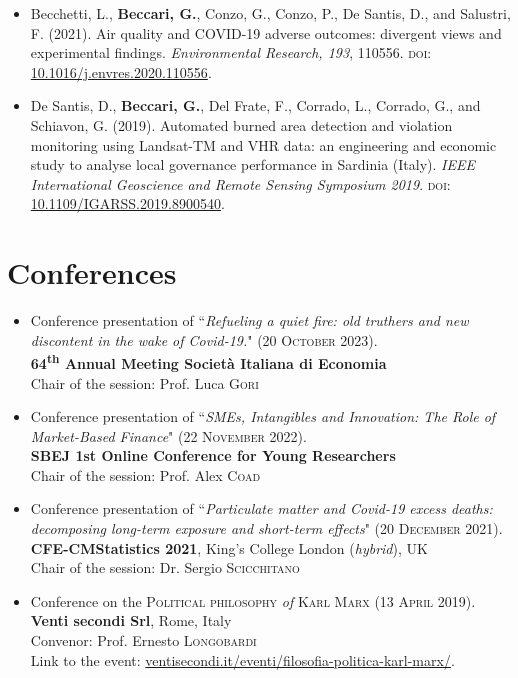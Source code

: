 \documentclass{article}
\begin{document}
\begin{itemize}
    \item Becchetti, L., \textbf{Beccari, G.}, Conzo, G., Conzo, P., De Santis, D., and Salustri, F. (2021). Air quality and COVID-19 adverse outcomes: divergent views and experimental findings. \emph{Environmental Research, 193}, 110556. \textsc{doi}: \href{https://doi.org/10.1016/j.envres.2020.110556}{10.1016/j.envres.2020.110556}.
    \item De Santis, D., \textbf{Beccari, G.}, Del Frate, F., Corrado, L., Corrado, G., and Schiavon, G. (2019). Automated burned area detection and violation monitoring using Landsat-TM and VHR data: an engineering and economic study to analyse local governance performance in Sardinia (Italy). \emph{IEEE International Geoscience and Remote Sensing Symposium 2019}. \textsc{doi}: \href{https://doi.org/10.1109/IGARSS.2019.8900540}{10.1109/IGARSS.2019.8900540}.
\end{itemize}

\section*{Conferences}

\begin{itemize}
    \item Conference presentation of ``\emph{Refueling a quiet fire: old truthers and new discontent in the wake of Covid-19.}" (20 \textsc{October} 2023).\\
    \textbf{64\textsuperscript{th} Annual Meeting Società Italiana di Economia}\\
    Chair of the session: Prof. Luca \textsc{Gori}
    \item Conference presentation of ``\emph{SMEs, Intangibles and Innovation: The Role of Market-Based Finance}" (22 \textsc{November} 2022).\\
    \textbf{SBEJ 1st Online Conference for Young Researchers}\\
    Chair of the session: Prof. Alex \textsc{Coad}
    \item Conference presentation of ``\emph{Particulate matter and Covid-19 excess deaths: decomposing long-term exposure and short-term effects}" (20 \textsc{December} 2021).\\
    \textbf{CFE-CMStatistics 2021}, King's College London (\emph{hybrid}), UK\\
    Chair of the session: Dr. Sergio \textsc{Scicchitano}

	\item Conference on the \textsc{Political philosophy} \textit{of} \textsc{Karl Marx} (13 \textsc{April} 2019).\\
	\textbf{Venti secondi Srl}, Rome, Italy\\
	Convenor: Prof. Ernesto \textsc{Longobardi}\\ 
	Link to the event: \href{https://ventisecondi.it/eventi/filosofia-politica-karl-marx/}{ventisecondi.it/eventi/filosofia-politica-karl-marx/}.

\end{itemize}
\end{document}
